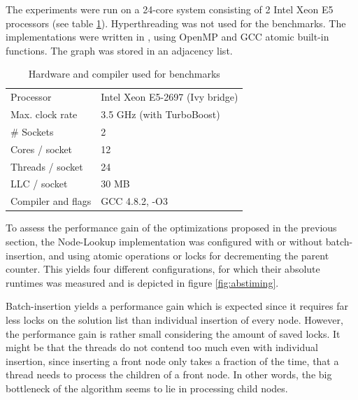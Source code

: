 The experiments were run on a 24-core system consisting of 2 Intel Xeon E5 processors (see table \ref{tab:hardware}).
Hyperthreading was not used for the benchmarks.
The implementations were written in \Cpp, using OpenMP and GCC atomic built-in functions. The graph was stored in an adjacency list.

  \begin{table}[h]
    \centering
    \begin{tabular}{ll}
    \toprule
    Processor        & Intel Xeon E5-2697 (Ivy bridge) \\
    Max. clock rate  & 3.5 GHz (with TurboBoost)\\
    \# Sockets       & 2 \\
    Cores / socket   & 12 \\
    Threads / socket & 24 \\
    LLC / socket     & 30 MB \\
    \midrule
    Compiler and flags & GCC 4.8.2, -O3\\
    \bottomrule
    \end{tabular}
    \caption{Hardware and compiler used for benchmarks}
    \label{tab:hardware}
  \end{table}
 

To assess the performance gain of the optimizations proposed in the previous section, the Node-Lookup implementation was configured with or without batch-insertion,
and using atomic operations or locks for decrementing the parent counter.
This yields four different configurations, for which their absolute runtimes was measured and is depicted in figure \ref{fig:abstiming}.

Batch-insertion yields a performance gain which is expected since it requires far less locks on the solution list than individual insertion of every node.
However, the performance gain is rather small considering the amount of saved locks.
It might be that the threads do not contend too much even with individual insertion, since inserting a front node only takes a fraction of the time, that a thread needs to process the children of a front node.
In other words, the big bottleneck of the algorithm seems to lie in processing child nodes.


